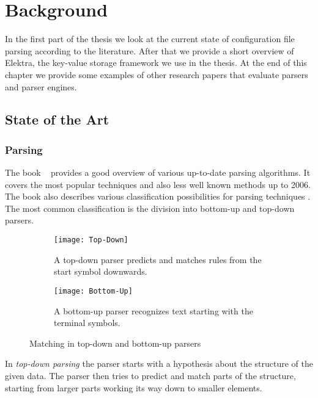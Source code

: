 \chapter{Background}

In the first part of the thesis we look at the current state of configuration file parsing according to the literature. After that we provide a short overview of Elektra, the key-value storage framework we use in the thesis. At the end of this chapter we provide some examples of other research papers that evaluate parsers and parser engines.

\section{State of the Art}
\label{sec:state_of_the_art}

\subsection{Parsing}
\label{sec:parsing}

The book ~\cite{grune2008parsing} provides a good overview of various up-to-date parsing algorithms. It covers the most popular techniques and also less well known methods up to 2006. The book also describes various classification possibilities for parsing techniques \cite[p. 85]{grune2008parsing}. The most common classification is the division into bottom-up and top-down parsers.

\begin{figure}
  \centering
  \begin{subfigure}[t]{.48\textwidth}
    \texttt{[image: Top-Down]}
    \caption{A top-down parser predicts and matches rules from the start symbol downwards.}
  \end{subfigure}
  \quad
  \begin{subfigure}[t]{.48\textwidth}
    \texttt{[image: Bottom-Up]}
    \caption{A bottom-up parser recognizes text starting with the terminal symbols.}
  \end{subfigure}
  \caption{Matching in top-down and bottom-up parsers}
\end{figure}

In \emph{top-down parsing} the parser starts with a hypothesis about the structure of the given data. The parser then tries to predict and match parts of the structure, starting from larger parts working its way down to smaller elements.

